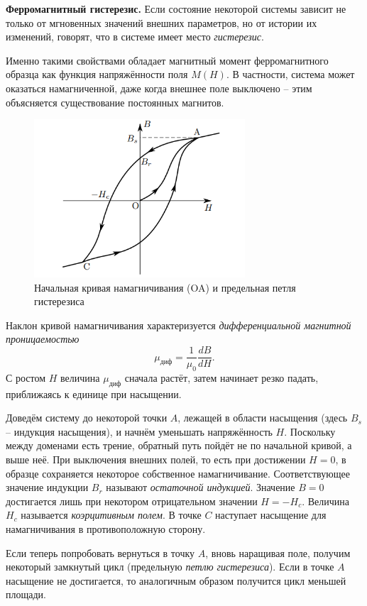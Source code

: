 \documentclass[a4paper,12pt]{article}
\begin{document}
\textbf{Ферромагнитный гистерезис.} 
Если состояние некоторой системы зависит не только от мгновенных значений внешних параметров, но от истории их изменений, говорят, что в системе имеет место \textit{гистерезис}.

Именно такими свойствами обладает магнитный момент ферромагнитного образца как функция напряжённости поля $M(H)$. В частности, система может оказаться намагниченной, даже когда внешнее поле выключено -- этим объясняется существование постоянных магнитов.
\begin{figure}[H]\label{fig: Гистерезис картинка}
    \centering
    \includegraphics[width = 0.7\textwidth]{Гистерезис картинка.png}
    \caption{Начальная кривая намагничивания (OA) и предельная петля гистерезиса}
\end{figure}
Наклон кривой намагничивания характеризуется \textit{дифференциальной магнитной проницаемостью}
\[\mu_{диф} = \frac{1}{\mu_0} \frac{dB}{dH} .\]
С ростом $H$ величина $\mu_{диф}$ сначала растёт, затем начинает резко падать,
 приближаясь к единице при насыщении.

Доведём систему до некоторой точки $A$, лежащей в области насыщения (здесь $B_s$-- индукция насыщения), и начнём уменьшать напряжённость $H$. Поскольку между доменами есть трение, обратный путь пойдёт не по начальной кривой, а выше неё.
При выключения внешних полей, то есть при достижении $H = 0$, в образце сохраняется некоторое собственное намагничивание. Соответствующее значение индукции $B_r$ называют \textit{остаточной индукцией}. Значение $B = 0$ достигается лишь при некотором отрицательном значении $H = - H_c$. Величина $H_c$ называется \textit{коэрцитивным полем}. В точке $C$ наступает насыщение для намагничивания в противоположную сторону.

Если теперь попробовать вернуться в точку $A$, вновь наращивая поле, получим некоторый замкнутый цикл (предельную \textit{петлю гистерезиса}). Если в точке $A$ насыщение не достигается, то аналогичным образом получится цикл меньшей площади. 
\end{document}
